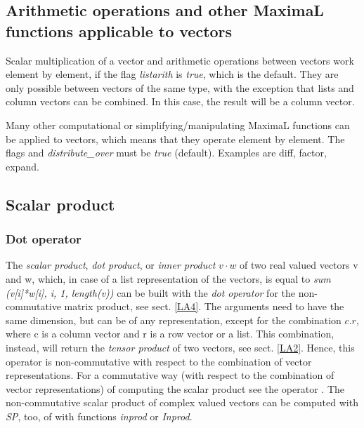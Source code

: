 \documentclass[../Maxima_Workbook.tex]{subfiles}
\begin{document}
\subsection{Arithmetic operations and other MaximaL functions applicable to vectors}

\lz {} \hfill {}

\lz Scalar multiplication of a vector and arithmetic operations between vectors work element by element, if the flag \emph{listarith} is \emph{true}, which is the default. They are only possible between vectors of the same type, with the exception that lists and column vectors can be combined. In this case, the result will be a column vector. 

\lzz {} \hfill {}

\lz Many other computational or simplifying/manipulating MaximaL functions can be applied to vectors, which means that they operate element by element. The flags  and \emph{distribute\_over} must be \emph{true} (default). Examples are diff, factor, expand.

\subsection{Scalar product}\label{LA3}

\subsubsection{Dot operator}

The \emph{scalar product}, \emph{dot product}, or \emph{inner product} $ v \cdot w $ of two real valued vectors v and w, which, in case of a list representation of the vectors, is equal to \emph{sum (v[i]*w[i], i, 1, length(v))} can be built with the \emph{dot operator} for the non-commutative matrix product, see sect. \ref{LA4}. The arguments need to have the same dimension, but can be of any representation, except for the combination $ c.r $, where c is a column vector and r is a row vector or a list. This combination, instead, will return the \emph{tensor product} of two vectors, see sect. \ref{LA2}. Hence, this operator is non-commutative with respect to the combination of vector representations. For a commutative way (with respect to the combination of vector representations) of computing the scalar product see the operator . The non-commutative scalar product of complex valued vectors can be computed with \emph{SP}, too, of with functions \emph{inprod} or \emph{Inprod}.
\end{document}
